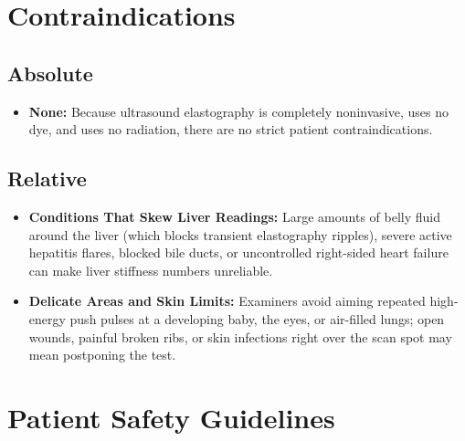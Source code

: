 \section{Contraindications}

\subsection{Absolute}

\begin{itemize}
    \item \textbf{None:} Because ultrasound elastography is completely noninvasive, uses no dye, and uses no radiation, there are no strict patient contraindications.
\end{itemize}

\subsection{Relative}

\begin{itemize}
    \item \textbf{Conditions That Skew Liver Readings:} Large amounts of belly fluid around the liver (which blocks transient elastography ripples), severe active hepatitis flares, blocked bile ducts, or uncontrolled right-sided heart failure can make liver stiffness numbers unreliable.
    \item \textbf{Delicate Areas and Skin Limits:} Examiners avoid aiming repeated high-energy push pulses at a developing baby, the eyes, or air-filled lungs; open wounds, painful broken ribs, or skin infections right over the scan spot may mean postponing the test.
\end{itemize}

\section{Patient Safety Guidelines}

